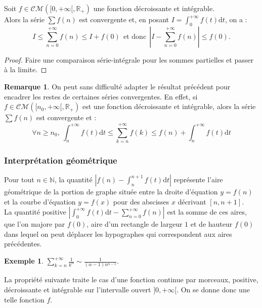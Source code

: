 \documentclass[french]{article}
\newcommand{\N}{\mathbb{N}}
\newcommand{\R}{\mathbb{R}}
\renewcommand{\d}{\text{d}}
\theoremstyle{plain}
\theoremstyle{definition}
\newtheorem*{ex}{Exemple}
\newtheorem*{rmq}{Remarque}
\theoremstyle{remark}
\begin{document}
\begin{prop}
	Soit $f\in\mathcal{CM}([0,+\infty[,\R_+)$ une fonction décroissante et intégrable. \\
	Alors la série $\displaystyle\sum f(n)$ est convergente et, en posant $I=\displaystyle\int_{0}^{+\infty}f(t)\d t$, on a : $$I\leqslant\sum_{n=0}^{+\infty}f(n)\leqslant I+f(0)\ \ \text{et donc}\ \ \left\lvert I-\sum_{n=0}^{+\infty}f(n)\right\rvert\leqslant f(0).$$
\end{prop}
\begin{proof}
	Faire une comparaison série-intégrale pour les sommes partielles et passer à la limite.
\end{proof}

\begin{rmq}
	On peut sans difficulté adapter le résultat précédent pour encadrer les restes de certaines séries convergentes. En effet, si $f\in\mathcal{CM}([n_0,+\infty[,\R_+)$ est une fonction décroissante et intégrable, alors la série $\displaystyle\sum f(n)$ est convergente et :
	$$\forall n\geqslant n_0,\ \int_{n}^{+\infty}f(t)\d t\leqslant\sum_{k=n}^{+\infty}f(k)\leqslant f(n)+ \int_{n}^{+\infty}f(t)\d t$$
\end{rmq}

\subsubsection*{Interprétation géométrique}

Pour tout $n\in\N$, la quantité $\displaystyle\left\lvert f(n)-\int_{n}^{n+1}f(t)\d t\right\rvert$ représente l'aire géométrique de la portion de graphe située entre la droite d'équation $y=f(n)$ et la courbe d'équation $y=f(x)$ pour des abscisses $x$ décrivant $[n,n+1]$. \\

La quantité positive $\displaystyle\left\lvert\int_{0}^{+\infty}f(t)\d t-\sum_{n=0}^{+\infty}f(n)\right\rvert$ est la somme de ces aires, que l'on majore par $f(0)$, aire d'un rectangle de largeur $1$ et de hauteur $f(0)$ dans lequel on peut déplacer les hypographes qui correspondent aux aires précédentes.

\begin{ex}
	$\displaystyle\sum_{k=n}^{+\infty}\frac{1}{k^\alpha}\sim\frac{1}{(\alpha-1)n^{\alpha-1}}$.
\end{ex}

La propriété suivante traite le cas d'une fonction continue par morceaux, positive, décroissante et intégrable sur l'intervalle ouvert $]0,+\infty[$. On se donne donc une telle fonction $f$.
\end{document}
